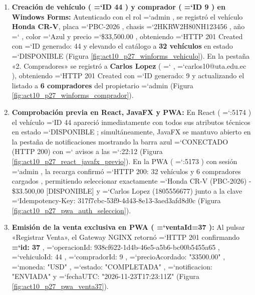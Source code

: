 \documentclass[11pt,a4paper]{article}
\renewcommand{\_}{\oldunderscore\allowbreak}
\DeclareRobustCommand{\texttt}[1]{%
  {\upshape\ttfamily\fontsize{9}{10.8}\selectfont\hyphenchar\font=`\-\relax #1}%
}
\begin{document}
\begin{enumerate}[leftmargin=*,itemsep=3pt,topsep=2pt]
  \item \textbf{Creación de vehículo (\texttt{ID 44}) y comprador (\texttt{ID 9}) en Windows Forms:} Autenticado con el rol \texttt{admin}, se registró el vehículo \textbf{Honda CR-V}, placa \texttt{PBC-2026}, chasis \texttt{2HKRW2H80NH123456}, año \texttt{2026}, color \texttt{Azul} y precio \texttt{\$33,500.00}, obteniendo \texttt{HTTP 201 Created} con \texttt{ID generado: 44} y elevando el catálogo a \textbf{32 vehículos} en estado \texttt{DISPONIBLE} (Figura \ref{fig:act10_p27_winforms_vehiculo}). En la pestaña «2. Compradores» se registró a \textbf{Carlos Lopez} (\texttt{1805556677}, \texttt{carlos10@uta.\allowbreak{}edu.\allowbreak{}ec}), obteniendo \texttt{HTTP 201 Created} con \texttt{ID generado: 9} y actualizando el listado a \textbf{6 compradores} del propietario \texttt{admin} (Figura \ref{fig:act10_p27_winforms_comprador}).
  \item \textbf{Comprobación previa en React, JavaFX y PWA:} En React (\texttt{:5174}) el vehículo \texttt{ID 44} apareció inmediatamente con todos sus atributos técnicos en estado \texttt{DISPONIBLE}; simultáneamente, JavaFX se mantuvo abierto en la pestaña de notificaciones mostrando la barra azul \texttt{CONECTADO (HTTP 200)} con \texttt{0} avisos a las \texttt{12:22:12} (Figura \ref{fig:act10_p27_react_javafx_previo}). En la PWA (\texttt{:5173}) con sesión \texttt{admin}, la recarga confirmó \texttt{HTTP 200: 32 vehículos y 6 compradores cargados}, permitiendo seleccionar exactamente \texttt{[ID 44] Honda CR-V (PBC-2026) - \$33.\allowbreak{}500,\allowbreak{}00 [DISPONIBLE]} y \texttt{[ID 9] Carlos Lopez (1805556677)} junto a la clave \texttt{Idempotency-Key: 317f7cbc-53f9-4d43-8e13-3aed3afd8d0c} (Figura \ref{fig:act10_p27_pwa_auth_seleccion}).
  \item \textbf{Emisión de la venta exclusiva en PWA (\texttt{ventaId=37}):} Al pulsar «Registrar Venta», el Gateway NGINX retornó \texttt{HTTP 201} confirmando \textbf{\texttt{id: 37}}, \texttt{operacionId: 938cf622-1d4b-46e5-a5b6-bc00b5455a65}, \texttt{vehiculoId: 44}, \texttt{compradorId: 9}, \texttt{precioAcordado: "33500.\allowbreak{}00"}, \texttt{moneda: "USD"}, \texttt{estado: "COMPLETADA"}, \texttt{notificacion: "ENVIADA"} y \texttt{fechaUTC: "2026-11-23T17:\allowbreak{}23:\allowbreak{}11Z"} (Figura \ref{fig:act10_p27_pwa_venta37}).

\end{enumerate}
\end{document}
